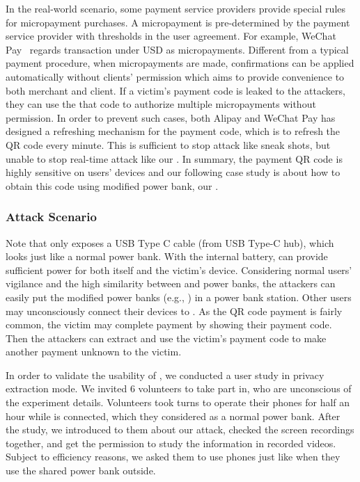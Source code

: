 In the real-world scenario, some payment service providers provide special rules for micropayment purchases. 
A micropayment is pre-determined by the payment service provider with thresholds in the user agreement. 
For example, WeChat Pay~\cite{Wechat-pay} regards transaction under USD  as micropayments. 
Different from a typical payment procedure, when micropayments are made, confirmations can be applied automatically without clients' permission which aims to provide convenience to both merchant and client.
If a victim's payment code is leaked to the attackers, they can use the that code to authorize multiple micropayments without permission. 
In order to prevent such cases, both Alipay and WeChat Pay has designed a refreshing mechanism for the payment code, which is to refresh the QR code every minute. This is sufficient to stop attack like sneak shots, but unable to stop real-time attack like our \tool.
In summary, the payment QR code is highly sensitive on users' devices and our following case study is about how to obtain this code using modified power bank, our \tool.

\subsubsection{Attack Scenario}

Note that \tool only exposes a USB Type C cable (from USB Type-C hub), which looks just like a normal power bank. With the internal battery, \tool can provide sufficient power for both itself and the victim's device.
Considering normal users' vigilance and the high similarity between \tool and power banks, the attackers can easily put the modified power banks (e.g., \tool) in a power bank station.
Other users may unconsciously connect their devices to \tool.
As the QR code payment is fairly common, the victim may complete payment by showing their payment code. 
Then the attackers can extract and use the victim's payment code to make another payment unknown to the victim.

In order to validate the usability of \tool, we conducted a user study in privacy extraction mode. 
We invited 6 volunteers to take part in, who are unconscious of the experiment details.
Volunteers took turns to operate their phones for half an hour while \tool is connected, which they considered as a normal power bank.
After the study, we introduced to them about our attack, checked the screen recordings together, and get the permission to study the information in recorded videos.
Subject to efficiency reasons, we asked them to use phones just like when they use the shared power bank outside.


